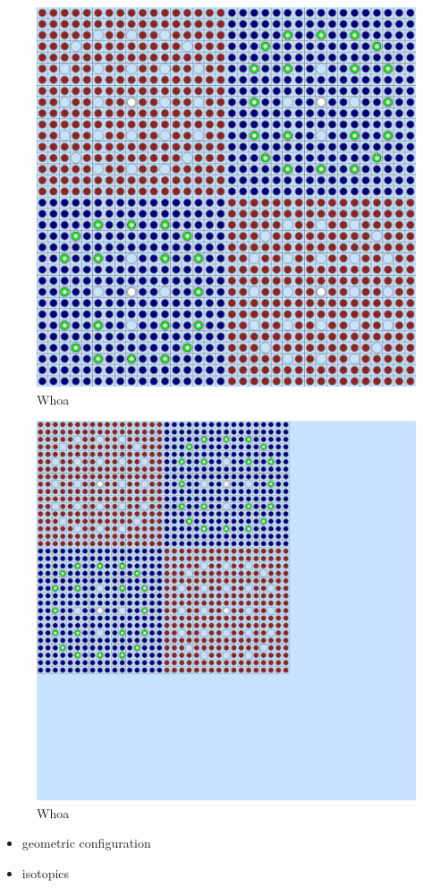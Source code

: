 \begin{figure}[h!]
  \centering
  \includegraphics[width=0.65\linewidth]{figures/benchmarks/2x2}
\caption[A 2$\times$2 colorset of BEAVRS assemblies]{Whoa}
\label{fig:chap7-2x2}
\end{figure}

\begin{figure}[h!]
  \centering
  \includegraphics[width=0.65\linewidth]{figures/benchmarks/reflector}
\caption[A reflected 2$\times$2 colorset of BEAVRS assemblies]{Whoa}
\label{fig:chap7-reflector}
\end{figure}

\begin{itemize}[noitemsep]
  \item geometric configuration
  \item isotopics
\end{itemize}

